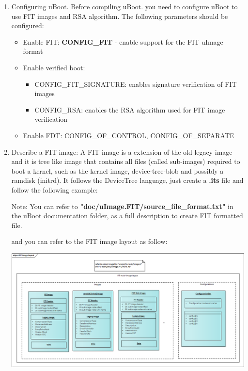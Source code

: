 \documentclass{article}
\begin{document}
\begin{enumerate}
    \item Configuring uBoot. Before compiling uBoot. you need to configure uBoot to use FIT images and RSA algorithm. 
    The following parameters should be configured:
        \begin{itemize}
            \item Enable FIT: \textbf{CONFIG\_FIT} - enable support for the FIT uImage format
            \item Enable verified boot:
            \begin{itemize}
                \item CONFIG\_FIT\_SIGNATURE: enables signature verification of FIT images
                \item CONFIG\_RSA: enables the RSA algorithm used for FIT image verification
            \end{itemize}
        
            \item Enable FDT: CONFIG\_OF\_CONTROL, CONFIG\_OF\_SEPARATE
        \end{itemize}    
    
    \item Describe a FIT image:
        A FIT image is a extension of the old legacy image and it is tree like image that contains all files (called sub-images) required to boot a kernel, such as the kernel image, device-tree-blob and possibly a ramdisk (initrd). It follows the DeviceTree language, just create a \textbf{.its} file and follow the following example:    
        
       
        Note: You can refer to \textbf{"doc/uImage.FIT/source\_file\_format.txt"} in the uBoot documentation folder, as a full description to create FIT formatted file.

        and you can refer to the FIT image layout as follow:
        
        \begin{center}
            \includegraphics[scale=0.50]{./resources/img/FIT Image Layout.png}
        \end{center}


\end{enumerate}
\end{document}
